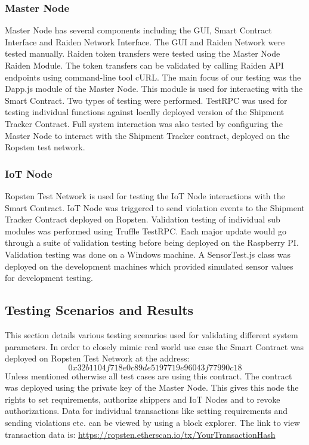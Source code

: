 \subsubsection{Master Node}
Master Node has several components including the GUI, Smart Contract Interface and Raiden Network Interface. The GUI and Raiden Network were tested manually. Raiden token transfers were tested using the Master Node Raiden Module. The token transfers can be validated by calling Raiden API endpoints using command-line tool cURL. The main focus of our testing was the Dapp.js module of the Master Node. This module is used for interacting with the Smart Contract. Two types of testing were performed. TestRPC was used for testing individual functions against locally deployed version of the Shipment Tracker Contract. Full system interaction was also tested by configuring the Master Node to interact with the Shipment Tracker contract, deployed on the Ropsten test network.
\vspace{0.5cm}
\subsubsection{IoT Node}
Ropsten Test Network is used for testing the IoT Node interactions with the Smart Contract. IoT Node was triggered to send violation events to the Shipment Tracker Contract deployed on Ropsten. Validation testing of individual sub modules was performed using Truffle TestRPC. Each major update would go through a suite of validation testing before being deployed on the Raspberry PI. Validation testing was done on a Windows machine. A SensorTest.js class was deployed on the development machines which provided simulated sensor values for development testing. 
\vspace{0.5cm}
\subsection{Testing Scenarios and Results}
This section details various testing scenarios used for validating different system parameters. In order to closely mimic real world use case the Smart Contract was deployed on Ropsten Test Network at the address: \[0x32b1104f718e0c89de5197719e96043f77990c18\]
Unless mentioned otherwise all test cases are using this contract. The contract was deployed using the private key of the Master Node. This gives this node the rights to set requirements, authorize shippers and IoT Nodes and to revoke authorizations.  Data for individual transactions like setting requirements and sending violations etc. can be viewed by using a block explorer. The link to view transaction data is: \url{https://ropsten.etherscan.io/tx/YourTransactionHash}
\vspace{0.5cm}

